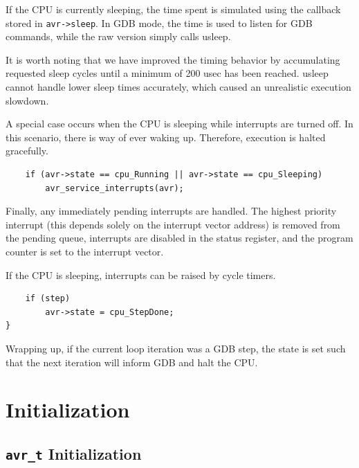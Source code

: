 If the \ac{CPU} is currently sleeping, the time spent is simulated using the callback
stored in \lstinline|avr->sleep|. In \ac{GDB} mode, the time is used to listen for
\ac{GDB} commands, while the raw version simply calls usleep.

It is worth noting that
we have improved the timing behavior by accumulating requested sleep cycles until
a minimum of 200 usec has been reached. usleep cannot handle lower sleep times
accurately, which caused an unrealistic execution slowdown.

A special case occurs when the \ac{CPU} is sleeping while interrupts are turned off.
In this scenario, there is way of ever waking up. Therefore, execution is halted
gracefully.

\begin{lstlisting}
    if (avr->state == cpu_Running || avr->state == cpu_Sleeping)
        avr_service_interrupts(avr);
\end{lstlisting}

Finally, any immediately pending interrupts are handled. The highest priority
interrupt (this depends solely on the interrupt vector address) is removed from
the pending queue, interrupts are disabled in the status register, and the
program counter is set to the interrupt vector.

If the \ac{CPU} is sleeping, interrupts can be raised by cycle timers.

\begin{lstlisting}
    if (step)
        avr->state = cpu_StepDone;
}
\end{lstlisting}

Wrapping up, if the current loop iteration was a \ac{GDB} step, the state is set
such that the next iteration will inform \ac{GDB} and halt the \ac{CPU}.


\section{Initialization}

\subsection{\lstinline|avr_t| Initialization} \label{subsection:avr_t_initialization}

